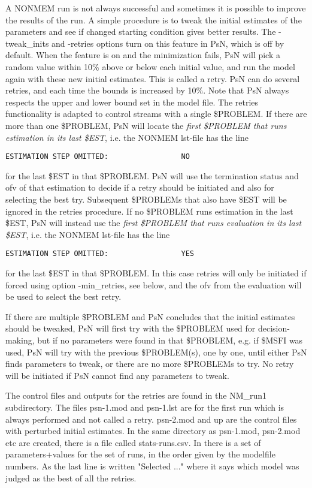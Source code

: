 A NONMEM run is not always successful and sometimes it is possible to improve the results of the run. 
A simple procedure is to tweak the initial estimates of the parameters and see if changed starting condition gives better results. 
The -tweak\_inits and -retries options turn on this feature in PsN, which is off by default. When the feature is on and the minimization fails, PsN will pick a random value within 10\% above or below each initial value, and run the model again with these new initial estimates. This is called a retry. PsN can do several retries, and each time the bounds is increased by 10\%. Note that PsN always respects the upper and lower bound set in the model file. 
\newpage
The retries functionality is adapted to control streams with a single \$PROBLEM. If there are more than one \$PROBLEM, PsN will
locate the \emph{first \$PROBLEM that runs estimation in its last \$EST}, i.e. the NONMEM lst-file has the line
\begin{verbatim}
ESTIMATION STEP OMITTED:                 NO
\end{verbatim}
for the last \$EST in that \$PROBLEM. PsN will use the termination status and ofv of that estimation to decide if a retry should be initiated and also for selecting the best try. Subsequent \$PROBLEMs that also have \$EST will be ignored in the retries procedure.
If no \$PROBLEM runs estimation in the last \$EST, PsN will instead use the \emph{first \$PROBLEM that runs evaluation in its last \$EST}, i.e. the NONMEM lst-file has the line 
\begin{verbatim}
ESTIMATION STEP OMITTED:                 YES
\end{verbatim}
for the last \$EST in that \$PROBLEM. In this case retries will only be initiated if forced using option -min\_retries, see below,
and the ofv from the evaluation will be used to select the best retry.

If there are multiple \$PROBLEM and PsN concludes that the initial estimates should be tweaked, PsN will first try with the
\$PROBLEM used for decision-making, but if no parameters were found in that \$PROBLEM, e.g. if \$MSFI was used, PsN will try with the previous \$PROBLEM(s), one by one, until either PsN finds parameters to tweak, or there are no more \$PROBLEMs to try. No retry will be initiated if PsN cannot find any parameters to tweak.

The control files and outputs for the retries are found in the NM\_run1 subdirectory. The files psn-1.mod and psn-1.lst are for 
the first run which is always performed and not called a retry. psn-2.mod and up are the control files with perturbed initial 
estimates. In the same directory as psn-1.mod, psn-2.mod etc are created, there is a file called stats-runs.csv. In there is a 
set of parameters+values for the set of runs, in the order given by the modelfile numbers. As the last line is written "Selected ..." where it says which model was judged as the best of all the retries.

